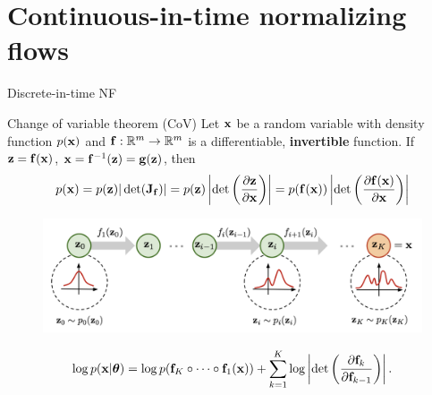 \section{Continuous-in-time normalizing flows}
\begin{frame}{Discrete-in-time NF}
	\vspace{-0.3cm}
	\begin{block}{Change of variable theorem (CoV)}
		Let $\mathbf{x}$ be a random variable with density function $p(\mathbf{x})$ and $\mathbf{f}: \mathbb{R}^m \rightarrow \mathbb{R}^m$ is a differentiable, \textbf{invertible} function. If $\mathbf{z} = \mathbf{f}(\mathbf{x})$, $\mathbf{x} = \mathbf{f}^{-1}(\mathbf{z}) = \mathbf{g}(\mathbf{z})$, then
		\vspace{-0.3cm}
		\[
			p(\mathbf{x}) = p(\mathbf{z}) |\det(\mathbf{J}_{\mathbf{f}})| = p(\mathbf{z}) \left|\det \left( \frac{\partial \mathbf{z}}{\partial \mathbf{x}} \right) \right| = p(\mathbf{f}(\mathbf{x})) \left|\det \left(  \frac{\partial \mathbf{f}(\mathbf{x})}{\partial \mathbf{x}} \right) \right|
		\]
		\vspace{-0.5cm}
	\end{block}

	\vspace{-0.3cm}
	\begin{figure}
		\includegraphics[width=0.95\linewidth]{figs/normalizing-flow}
	\end{figure}
	\vspace{-0.4cm}
	\[
		\log p(\mathbf{x} | \boldsymbol{\theta}) = \log p(\mathbf{f}_K \circ \dots \circ \mathbf{f}_1(\mathbf{x})) + \sum_{k=1}^K\log \left|\det \left(\frac{\partial \mathbf{f}_k}{\partial \mathbf{f}_{k-1}}\right)\right|.
	\]
	\vspace{-0.4cm}
\end{frame}
